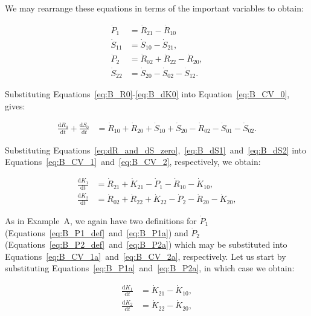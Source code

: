 We may rearrange these equations in terms of
the important variables to obtain:

\begin{align}
\label{eq:B_P1a}
	\dot{P}_{1}												&
	= \dot{R}_{21}
	- \dot{R}_{10}											\\
\label{eq:B_S11}
	\dot{S}_{11}											&
	= \dot{S}_{10}
	- \dot{S}_{21},										\\
\label{eq:B_P2a}
	\dot{P}_{2}												&
	= \dot{R}_{02}
	+ \dot{R}_{22}
	- \dot{R}_{20},										\\
\label{eq:B_S22}
	\dot{S}_{22}											&
	= \dot{S}_{20}
	- \dot{S}_{02} 
	- \dot{S}_{12}.	
\end{align}


Substituting
Equations~\ref{eq:B_R0}-\ref{eq:B_dK0}
into Equation~\ref{eq:B_CV_0}, 
gives:

\begin{align} \label{eq:B_CV_0a}
	\frac{\mathrm{d}R_{0}}{\mathrm{d}t} 
	+ \frac{\mathrm{d}S_{0}}{\mathrm{d}t}		& 
	= \dot{R}_{10} + \dot{R}_{20} 
	+ \dot{S}_{10} + \dot{S}_{20} 
	- \dot{R}_{02} 
	- \dot{S}_{01}
	- \dot{S}_{02}.
\end{align}

Substituting Equations~\ref{eq:dR_and_dS_zero},~\ref{eq:B_dS1}~and~\ref{eq:B_dS2}
into Equations~\ref{eq:B_CV_1}~and~\ref{eq:B_CV_2},
respectively,
we obtain:

\begin{align} 
\label{eq:B_CV_1a}
	 \frac{\mathrm{d}K_{1}}{\mathrm{d}t}	&
	=  \dot{R}_{21}
	+ \dot{K}_{21}
	- \dot{P}_{1} 
	- \dot{R}_{10} 
	- \dot{K}_{10},							\\
\label{eq:B_CV_2a}
	\frac{\mathrm{d}K_{2}}{\mathrm{d}t}	&
	=  \dot{R}_{02} 
	+ \dot{R}_{22} 
	+ \dot{K}_{22}
	- \dot{P}_{2}
	- \dot{R}_{20} 
	- \dot{K}_{20},
\end{align}


As in Example~A,
we again have two definitions for $\dot{P}_{1}$
(Equations~\ref{eq:B_P1_def}~and~\ref{eq:B_P1a})
and $\dot{P}_{2}$ 
(Equations~\ref{eq:B_P2_def}~and~\ref{eq:B_P2a})
which may be substituted into
Equations~\ref{eq:B_CV_1a}~and~\ref{eq:B_CV_2a},
respectively. 
Let us start by substituting Equations~\ref{eq:B_P1a}~and~\ref{eq:B_P2a},
in which case we obtain:

\begin{align} 
\label{eq:B_CV_1b}
	 \frac{\mathrm{d}K_{1}}{\mathrm{d}t}	&
	= \dot{K}_{21}
	- \dot{K}_{10},							\\
\label{eq:B_CV_2b}
	\frac{\mathrm{d}K_{2}}{\mathrm{d}t}	&
	=  \dot{K}_{22}
	- \dot{K}_{20},
\end{align}

